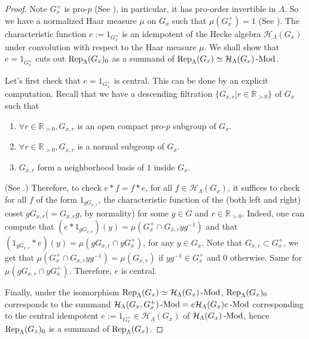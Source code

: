 	\begin{proof}
		Note $G_x^+$ is pro-$p$ (See \cite[II.5.2.(b)]{vigneras1996representations}), in particular, it has pro-order invertible in $\Lambda$. So we have a normalized Haar measure $\mu$ on $G_x$ such that $\mu(G_x^+)=1$ (See \cite[I.2.4]{vigneras1996representations}). The characteristic function $e:=1_{G_x^+}$ is an idempotent of the Hecke algebra $\mathcal{H}_{\Lambda}(G_x)$ under convolution with respect to the Haar measure $\mu$. We shall show that $e=1_{G_x^+}$ cuts out $\operatorname{\operatorname{Rep}}_{\Lambda}(G_x)_0$ as a summand of $\operatorname{\operatorname{Rep}}_{\Lambda}(G_x) \simeq \mathcal{H}_{\Lambda}(G_x)\operatorname{-Mod}$.
		
		Let's first check that $e=1_{G_x^+}$ is central. This can be done by an explicit computation. Recall that we have a descending filtration $\{G_{x,r} | r\in \mathbb{R}_{>0}\}$ of $G_x$ such that 
		\begin{enumerate}
			\item $\forall r \in \mathbb{R}_{>0}, G_{x,r}$ is an open compact pro-$p$ subgroup of $G_x$.
			\item $\forall r \in \mathbb{R}_{>0}, G_{x,r}$ is a normal subgroup of $G_x$.
			\item $G_{x,r}$ form a neighborhood basis of $1$ inside $G_x$. 
		\end{enumerate}
		(See \cite[II.5.1]{vigneras1996representations}.) Therefore, to check $e \ast f=f \ast e$, for all $f \in \mathcal{H}_{\Lambda}(G_x)$, it suffices to check for all $f$ of the form $1_{gG_{x,r}}$, the characteristic function of the (both left and right) coset $gG_{x,r}$($=G_{x,r}g$, by normality) for some $g \in G$ and $r \in \mathbb{R}_{>0}$. Indeed, one can compute that $(e \ast 1_{gG_{x,r}})(y)=\mu(G_x^+\cap G_{x,r}yg^{-1})$ and that $(1_{gG_{x,r}} \ast e)(y)=\mu(gG_{x,r}\cap yG_x^+)$, for any $y \in G_x$. Note that $G_{x,r} \subset G_x^+$, we get that $\mu(G_x^+\cap G_{x,r}yg^{-1})=\mu(G_{x,r})$ if $yg^{-1} \in G_x^+$ and $0$ otherwise. Same for $\mu(gG_{x,r}\cap yG_x^+)$. Therefore, $e$ is central.
		
		
		Finally, under the isomorphism $\operatorname{\operatorname{Rep}}_{\Lambda}(G_x) \simeq \mathcal{H}_{\Lambda}(G_x)\operatorname{-Mod}$, $\operatorname{\operatorname{Rep}}_{\Lambda}(G_x)_0$ corresponds to the summand $\mathcal{H}_{\Lambda}(G_x, G_x^+)\operatorname{-Mod}=e\mathcal{H}_{\Lambda}(G_x)e\operatorname{-Mod}$ corresponding to the central idempotent $e:=1_{G_x^+} \in \mathcal{H}_{\Lambda}(G_x)$ of $\mathcal{H}_{\Lambda}(G_x)\operatorname{-Mod}$, hence $\operatorname{\operatorname{Rep}}_{\Lambda}(G_x)_0$ is a summand of $\operatorname{\operatorname{Rep}}_{\Lambda}(G_x)$. 
	\end{proof}
	
